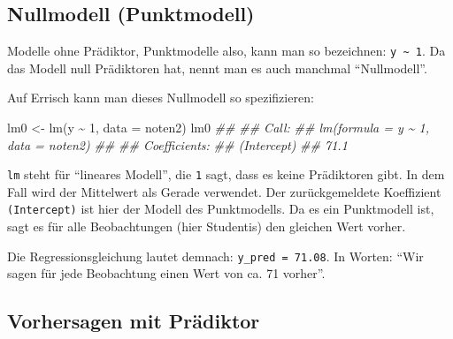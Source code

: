 \documentclass[
  a4paper,
]{scrbook}
\newenvironment{Shaded}{\begin{snugshade}}{\end{snugshade}}
\newcommand{\AttributeTok}[1]{\textcolor[rgb]{0.40,0.45,0.13}{#1}}
\newcommand{\DecValTok}[1]{\textcolor[rgb]{0.68,0.00,0.00}{#1}}
\newcommand{\DocumentationTok}[1]{\textcolor[rgb]{0.37,0.37,0.37}{\textit{#1}}}
\newcommand{\FunctionTok}[1]{\textcolor[rgb]{0.28,0.35,0.67}{#1}}
\newcommand{\NormalTok}[1]{\textcolor[rgb]{0.00,0.23,0.31}{#1}}
\newcommand{\OtherTok}[1]{\textcolor[rgb]{0.00,0.23,0.31}{#1}}
\newcommand{\SpecialCharTok}[1]{\textcolor[rgb]{0.37,0.37,0.37}{#1}}
\theoremstyle{definition}
\theoremstyle{definition}
\theoremstyle{definition}
\theoremstyle{remark}
\begin{document}
\subsection{Nullmodell (Punktmodell)}\label{nullmodell-punktmodell}

Modelle ohne Prädiktor, Punktmodelle also, kann man so bezeichnen:
\texttt{y\ \textasciitilde{}\ 1}. Da das Modell null Prädiktoren hat,
nennt man es auch manchmal ``Nullmodell''.

Auf Errisch kann man dieses Nullmodell so spezifizieren:

\begin{Shaded}
\begin{Highlighting}[]
\NormalTok{lm0 }\OtherTok{\textless{}{-}} \FunctionTok{lm}\NormalTok{(y }\SpecialCharTok{\textasciitilde{}} \DecValTok{1}\NormalTok{, }\AttributeTok{data =}\NormalTok{ noten2)}
\NormalTok{lm0}
\DocumentationTok{\#\# }
\DocumentationTok{\#\# Call:}
\DocumentationTok{\#\# lm(formula = y \textasciitilde{} 1, data = noten2)}
\DocumentationTok{\#\# }
\DocumentationTok{\#\# Coefficients:}
\DocumentationTok{\#\# (Intercept)  }
\DocumentationTok{\#\#        71.1}
\end{Highlighting}
\end{Shaded}

\texttt{lm} steht für ``lineares Modell'', die \texttt{1} sagt, dass es
keine Prädiktoren gibt. In dem Fall wird der Mittelwert als Gerade
verwendet. Der zurückgemeldete Koeffizient \texttt{(Intercept)} ist hier
der Modell des Punktmodells. Da es ein Punktmodell ist, sagt es für alle
Beobachtungen (hier Studentis) den gleichen Wert vorher.

Die Regressionsgleichung lautet demnach: \texttt{y\_pred\ =\ 71.08}. In
Worten: ``Wir sagen für jede Beobachtung einen Wert von ca. 71 vorher''.

\subsection{Vorhersagen mit
Prädiktor}\label{vorhersagen-mit-pruxe4diktor}
\end{document}
